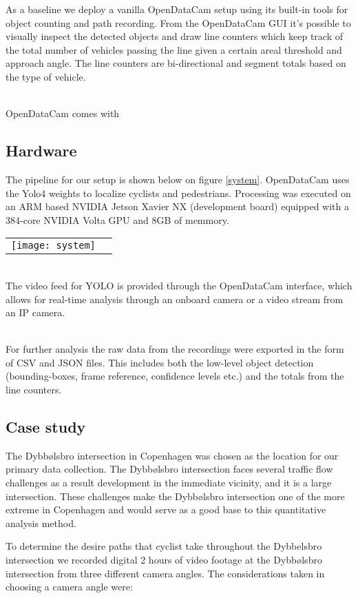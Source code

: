 As a baseline we deploy a vanilla OpenDataCam setup using its built-in tools for object counting and path recording.
From the OpenDataCam GUI it's possible to visually inspect the detected objects and draw line counters 
which keep track of the total number of vehicles passing the line given a certain areal threshold and approach angle. 
The line counters are bi-directional and segment totals based on the type of vehicle.

\ \\
OpenDataCam comes with


\subsection{Hardware}
The pipeline for our setup is shown below on figure \ref{system}. OpenDataCam uses the Yolo4 weights to localize cyclists and pedestrians.
Processing was executed on an ARM based NVIDIA Jetson Xavier NX (development board) equipped with a 384-core NVIDIA Volta GPU
and 8GB of memmory. 

\raggedbottom
\noindent
\begin{tabular}{@{}cc}
\texttt{[image: system]} 
\end{tabular}
\label{system}

\ \\
The video feed for YOLO is provided through the OpenDataCam interface, which allows for real-time analysis through an onboard camera
or a video stream from an IP camera. 

\ \\
For further analysis the raw data from the recordings were exported in the form of CSV and JSON files. This includes both the low-level
object detection (bounding-boxes, frame reference, confidence levels etc.) and the totals from the line counters.

\subsection{Case study}
The Dybbølsbro intersection in Copenhagen was chosen as the location for our primary data collection. 
The Dybbølsbro intersection faces several traffic flow challenges as a result development in the immediate vicinity, and it is a large intersection.
These challenges make the Dybbølsbro intersection one of the more extreme in Copenhagen and would serve as a good base to this quantitative analysis method. 

To determine the desire paths that cyclist take throughout the Dybbelsbro intersection we recorded digital 2 hours of video footage 
at the Dybbølsbro intersection from three different camera angles.
The considerations taken in choosing a camera angle were:

